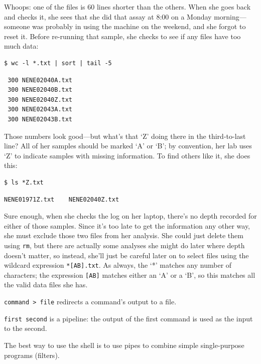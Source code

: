 \documentclass{book}
\begin{document}
Whoops: one of the files is 60 lines shorter than the others. When she
goes back and checks it, she sees that she did that assay at 8:00 on a
Monday morning---someone was probably in using the machine on the
weekend, and she forgot to reset it. Before re-running that sample, she
checks to see if any files have too much data:

\begin{verbatim}
$ wc -l *.txt | sort | tail -5
\end{verbatim}

\begin{verbatim}
 300 NENE02040A.txt
 300 NENE02040B.txt
 300 NENE02040Z.txt
 300 NENE02043A.txt
 300 NENE02043B.txt
\end{verbatim}

Those numbers look good---but what's that `Z' doing there in the
third-to-last line? All of her samples should be marked `A' or `B'; by
convention, her lab uses `Z' to indicate samples with missing
information. To find others like it, she does this:

\begin{verbatim}
$ ls *Z.txt
\end{verbatim}

\begin{verbatim}
NENE01971Z.txt    NENE02040Z.txt
\end{verbatim}

Sure enough, when she checks the log on her laptop, there's no depth
recorded for either of those samples. Since it's too late to get the
information any other way, she must exclude those two files from her
analysis. She could just delete them using \texttt{rm}, but there are
actually some analyses she might do later where depth doesn't matter, so
instead, she'll just be careful later on to select files using the
wildcard expression \texttt{*{[}AB{]}.txt}. As always, the `*' matches
any number of characters; the expression \texttt{{[}AB{]}} matches
either an `A' or a `B', so this matches all the valid data files she
has.

\begin{keypoints}
\begin{swcitemize}
\item
  \texttt{command \textgreater{} file} redirects a command's output to a
  file.
\item
  \texttt{first \textbar{} second} is a pipeline: the output of the
  first command is used as the input to the second.
\item
  The best way to use the shell is to use pipes to combine simple
  single-purpose programs (filters).
\end{swcitemize}
\end{keypoints}
\end{document}
